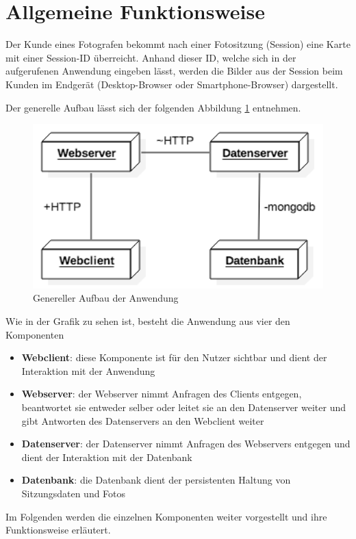 \section{Allgemeine Funktionsweise}
Der Kunde eines Fotografen bekommt nach einer Fotositzung (Session) eine Karte mit 
einer Session-ID überreicht. Anhand dieser ID, welche sich in der aufgerufenen 
Anwendung eingeben lässt, werden die Bilder aus der Session beim Kunden im Endgerät
(Desktop-Browser oder Smartphone-Browser) dargestellt.

Der generelle Aufbau lässt sich der folgenden Abbildung \ref{fig_genereller_aufbau} entnehmen.

\begin{figure}[h]
	\centering
	\includegraphics[width=14cm]{bilder/genereller_aufbau}
	\caption{Genereller Aufbau der Anwendung}
	\label{fig_genereller_aufbau}
\end{figure}

Wie in der Grafik zu sehen ist, besteht die Anwendung aus vier den Komponenten
\begin{itemize}
	\item \textbf{Webclient}: diese Komponente ist für den Nutzer sichtbar und dient der Interaktion mit der Anwendung
	\item \textbf{Webserver}: der Webserver nimmt Anfragen des Clients entgegen, beantwortet sie entweder selber oder leitet sie an den Datenserver weiter und gibt Antworten des Datenservers an den Webclient weiter
	\item \textbf{Datenserver}: der Datenserver nimmt Anfragen des Webservers entgegen und dient der Interaktion mit der Datenbank
	\item \textbf{Datenbank}: die Datenbank dient der persistenten Haltung von Sitzungsdaten und Fotos
\end{itemize}

Im Folgenden werden die einzelnen Komponenten weiter vorgestellt und ihre Funktionsweise erläutert.